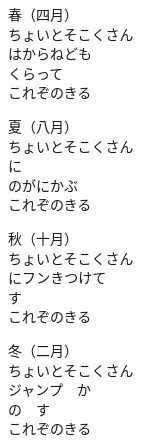 \documentclass[10pt,b5j]{tarticle} %
\begin{document}
\begin{enumerate} %
    \setlength{\itemindent}{\itemmargin}
    \begin{minipage}[c]{\blocksize}

        \vspace{\linespace}
        \item[春（四月）]~\\
        ちょいとそこくさん\\
        はからねども\\
        くらって\\
        これぞのきる
        
        \vspace{\linespace}
        \item[夏（八月）]~\\
        ちょいとそこくさん\\
        に\\
        のがにかぶ\\
        これぞのきる
        
    \end{minipage}
    \begin{minipage}[c]{\blocksize}

        \vspace{\linespace}
        \item[秋（十月）] ~\\
        ちょいとそこくさん\\
        にフンきつけて\\
        す\\
        これぞのきる
        
        \vspace{\linespace}
        \item[冬（二月）]~\\
        ちょいとそこくさん\\
        ジャンプ　か\\
        の　す\\
        これぞのきる
        

\end{minipage}
\end{enumerate}
\end{document}
